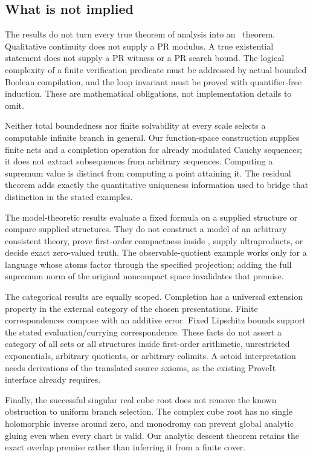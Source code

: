 \subsection{What is not implied}

The results do not turn every true theorem of analysis into an \ipra\ theorem. Qualitative continuity does not supply a PR modulus. A true existential statement does not supply a PR witness or a PR search bound. The logical complexity of a finite verification predicate must be addressed by actual bounded Boolean compilation, and the loop invariant must be proved with quantifier-free induction. These are mathematical obligations, not implementation details to omit.

Neither total boundedness nor finite solvability at every scale selects a computable infinite branch in general. Our function-space construction supplies finite nets and a completion operation for already modulated Cauchy sequences; it does not extract subsequences from arbitrary sequences. Computing a supremum value is distinct from computing a point attaining it. The residual theorem adds exactly the quantitative uniqueness information used to bridge that distinction in the stated examples.

The model-theoretic results evaluate a fixed formula on a supplied structure or compare supplied structures. They do not construct a model of an arbitrary consistent theory, prove first-order compactness inside \ipra, supply ultraproducts, or decide exact zero-valued truth. The observable-quotient example works only for a language whose atoms factor through the specified projection; adding the full supremum norm of the original noncompact space invalidates that premise.

The categorical results are equally scoped. Completion has a universal extension property in the external category of the chosen presentations. Finite correspondences compose with an additive error. Fixed Lipschitz bounds support the stated evaluation/currying correspondence. These facts do not assert a category of all sets or all structures inside first-order arithmetic, unrestricted exponentials, arbitrary quotients, or arbitrary colimits. A setoid interpretation needs derivations of the translated source axioms, as the existing ProveIt interface already requires.

Finally, the successful singular real cube root does not remove the known obstruction to uniform branch selection. The complex cube root has no single holomorphic inverse around zero, and monodromy can prevent global analytic gluing even when every chart is valid. Our analytic descent theorem retains the exact overlap premise rather than inferring it from a finite cover.

